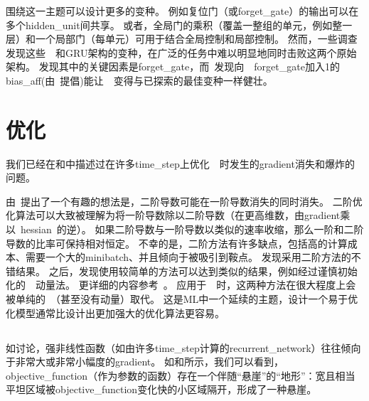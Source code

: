 
围绕这一主题可以设计更多的变种。
例如复位门（或\gls{forget_gate}）的输出可以在多个\gls{hidden_unit}间共享。
或者，全局门的乘积（覆盖一整组的单元，例如整一层）和一个局部门（每单元）可用于结合全局控制和局部控制。
然而，一些调查发现这些~~和GRU架构的变种，在广泛的任务中难以明显地同时击败这两个原始架构\citep{Greff-et-al-arxiv2015,Jozefowicz-et-al-ICML2015}。
\cite{Greff-et-al-arxiv2015}发现其中的关键因素是\gls{forget_gate}，而~\cite{Jozefowicz-et-al-ICML2015}发现向~~\gls{forget_gate}加入1的\gls{bias_aff}(由~\cite{Gers-et-al-2000}提倡)能让~~变得与已探索的最佳变种一样健壮。

\section{优化}
\label{sec:optimization_for_long_term_dependencies}
我们已经在和中描述过在许多\gls{time_step}上优化~~时发生的\gls{gradient}消失和爆炸的问题。

由~\cite{Martens+Sutskever-ICML2011}提出了一个有趣的想法是，二阶导数可能在一阶导数消失的同时消失。
二阶优化算法可以大致被理解为将一阶导数除以二阶导数（在更高维数，由\gls{gradient}乘以~\gls{hessian}~的逆）。
如果二阶导数与一阶导数以类似的速率收缩，那么一阶和二阶导数的比率可保持相对恒定。
不幸的是，二阶方法有许多缺点，包括高的计算成本、需要一个大的\gls{minibatch}、并且倾向于被吸引到鞍点。
\cite{Martens+Sutskever-ICML2011}发现采用二阶方法的不错结果。
之后，\cite{sutskeverimportance}发现使用较简单的方法可以达到类似的结果，例如经过谨慎初始化的~~动量法。
更详细的内容参考~\cite{Sutskever-thesis2012}。
应用于~~时，这两种方法在很大程度上会被单纯的~（甚至没有动量）取代。
这是\gls{ML}中一个延续的主题，设计一个易于优化模型通常比设计出更加强大的优化算法更容易。


\subsection{}
\label{sec:clipping_gradients}
如讨论，强非线性函数（如由许多\gls{time_step}计算的\gls{recurrent_network}）往往倾向于非常大或非常小幅度的\gls{gradient}。
如和所示，我们可以看到，\gls{objective_function}（作为参数的函数）存在一个伴随``悬崖''的``地形''：宽且相当平坦区域被\gls{objective_function}变化快的小区域隔开，形成了一种悬崖。

